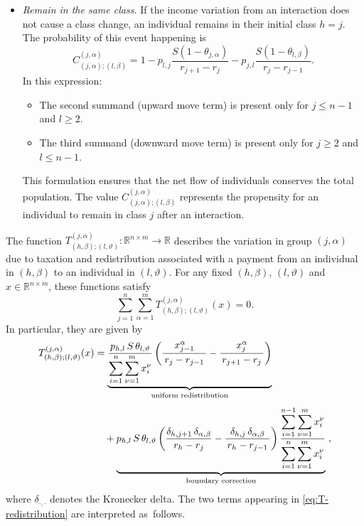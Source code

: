\documentclass[11pt]{article}
\theoremstyle{plain}
\theoremstyle{definition}
\newcommand{\1}{\mathbf{1}}
\begin{document}
\begin{itemize}
\item[\emph{iii}.] \textit{Remain in the same class.}
If the income variation from an interaction does not cause a class change, an individual remains in their initial class $h = j$. The probability of this event happening is
\begin{equation*}
C^{(j,\alpha)}_{(j,\alpha);(l,\beta)}
= 1
- p_{l,j}\frac{S(1-\theta_{j,\alpha})}{r_{j+1}-r_j}
- p_{j,l}\frac{S(1-\theta_{l,\beta})}{r_j-r_{j-1}}.
\end{equation*}
In this expression:
\begin{itemize}
    \item[$\bullet$] The second summand (upward move term) is present only for $j\leq n-1$ and $l\geq 2$.
    \item[$\bullet$] The third summand (downward move term) is present only for $j\geq 2$ and $l\leq n-1$.
\end{itemize}
This formulation ensures that the net flow of individuals conserves the total population. The value $C^{(j,\alpha)}_{(j,\alpha);(l,\beta)}$ represents the propensity for an individual to remain in class $j$ after an interaction.
\end{itemize}

The function $T^{(j,\alpha)}_{(h,\beta);(l,\vartheta)} \colon \mathbb{R}^{n\times m} \to \mathbb{R}$ describes the variation in group $(j,\alpha)$ due to taxation and redistribution associated with a payment from an individual in $(h,\beta)$ to an individual in $(l,\vartheta)$. For any fixed $(h,\beta)$, $(l,\vartheta)$ and $x \in \mathbb{R}^{n\times m}$, these functions satisfy
\begin{equation*}
    \sum_{j=1}^{n} \sum_{\alpha=1}^{m} T^{(j,\alpha)}_{(h,\beta);(l,\vartheta)}(x) =0.
\end{equation*}
In particular, they are given by
\begin{equation}\label{eq:T-redistribution}
\begin{aligned}
T^{(j,\alpha)}_{(h,\beta);(l,\vartheta)}(x)
&=
\underbrace{%
\frac{p_{h,l}\,S\,\theta_{l,\vartheta}}{\displaystyle \sum_{i=1}^{n}\sum_{\nu=1}^{m} x_i^\nu}
\left(
\frac{x_{j-1}^{\alpha}}{\,r_j-r_{j-1}\,}
-\frac{x_{j}^{\alpha}}{\,r_{j+1}-r_j\,}
\right)
}_{\text{uniform redistribution}}
\\[1ex]
&\quad+
\underbrace{%
p_{h,l}\,S\,\theta_{l,\vartheta}
\left(
\frac{\delta_{h,j+1}\,\delta_{\alpha,\beta}}{\,r_h-r_j\,}
-\frac{\delta_{h,j}\,\delta_{\alpha,\beta}}{\,r_h-r_{j-1}\,}
\right)
\frac{\displaystyle \sum_{i=1}^{n-1}\sum_{\nu=1}^{m} x_i^{\nu}}
     {\displaystyle \sum_{i=1}^{n}\sum_{\nu=1}^{m} x_i^\nu}
}_{\text{boundary correction}}
\;,
\end{aligned}
\end{equation}
where $\delta_{\cdot,\cdot}$ denotes the Kronecker delta. The two terms appearing in \eqref{eq:T-redistribution} are interpreted as~follows.
\end{document}
